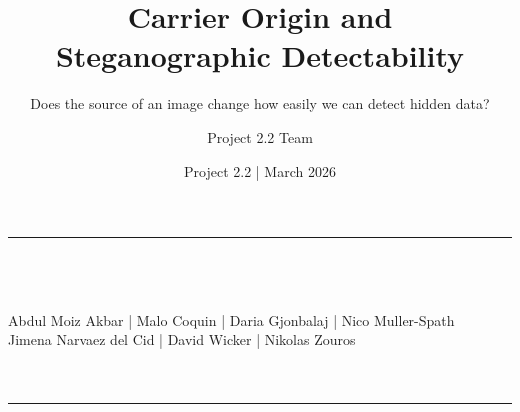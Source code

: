 \documentclass[aspectratio=169,11pt]{beamer}
\title{Carrier Origin and\\Steganographic Detectability}
\subtitle{Does the source of an image change how easily we can detect hidden data?}
\author[Project 2.2 Team]{Project 2.2 Team}
\institute{Department of Advanced Computing Sciences\\Maastricht University}
\date{Project 2.2 \;|\; March 2026}
\newcommand{\teamauthors}{Abdul Moiz Akbar \;|\; Malo Coquin \;|\; Daria Gjonbalaj \;|\; Nico Muller-Spath\\Jimena Narvaez del Cid \;|\; David Wicker \;|\; Nikolas Zouros}
\begin{document}
\begin{frame}[plain]
\vfill
\begin{center}
{\color{umorange}\rule{0.42\textwidth}{2pt}}\\[12pt]
{\LARGE\bfseries\color{umdark}\inserttitle}\\[10pt]
{\normalsize\color{umgray}\insertsubtitle}\\[16pt]
{\small\color{umdark}\teamauthors}\\[8pt]
{\small\color{umorange}\insertinstitute}\\[8pt]
{\footnotesize\color{umgray}\insertdate}\\[12pt]
{\color{umorange}\rule{0.42\textwidth}{2pt}}
\end{center}
\vfill
\end{frame}
\end{document}
